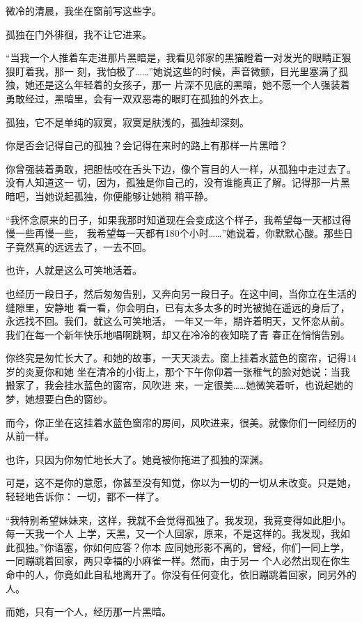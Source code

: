 		微冷的清晨，我坐在窗前写这些字。

		孤独在门外徘徊，我不让它进来。

		“当我一个人推着车走进那片黑暗是，我看见邻家的黑猫瞪着一对发光的眼睛正狠狠盯着我，那一
	刻，我怕极了……”她说这些的时候，声音微颤，目光里塞满了孤独，她还是这么年轻着的女孩子，那一
	片深不见底的黑暗，她不愿一个人强装着勇敢经过，黑暗里，会有一双双恶毒的眼盯在孤独的外衣上。

		孤独，它不是单纯的寂寞，寂寞是肤浅的，孤独却深刻。

		你是否会记得自己的孤独？会记得在来时的路上有那样一片黑暗？

		你曾强装着勇敢，把胆怯咬在舌头下边，像个盲目的人一样，从孤独中走过去了。没有人知道这一
	切，因为，孤独是你自己的，没有谁能真正了解。记得那一片黑暗吧，当她说起孤独，你便能够让她稍
	稍平静。

		“我怀念原来的日子，如果我那时知道现在会变成这个样子，我希望每一天都过得慢一些再慢一些，
	我希望每一天都有180个小时……”她说着，你默默心酸。那些日子竟然真的远远去了，一去不回。

		也许，人就是这么可笑地活着。

		也经历一段日子，然后匆匆告别，又奔向另一段日子。在这中间，当你立在生活的缝隙里，安静地
	看一看，你会明白，已有太多太多的时光被抛在遥远的身后了，永远找不回。我们，就这么可笑地活，
	一年又一年，期许着明天，又怀恋从前。我们在每一个新年快乐地唱啊跳啊，却又在冷冷的夜知晓了青
	春正在悄悄告别。

		你终究是匆忙长大了。和她的故事，一天天淡去。窗上挂着水蓝色的窗帘，记得14岁的炎夏你和她
	坐在清冷的小街上，那个下午你仰着一张稚气的脸对她说：当我搬家了，我会挂水蓝色的窗帘，风吹进
	来，一定很美……她微笑着听，也说起她的梦，她想要白色的窗纱。

		而今，你正坐在这挂着水蓝色窗帘的房间，风吹进来，很美。就像你们一同经历的从前一样。

		也许，只因为你匆忙地长大了。她竟被你拖进了孤独的深渊。

		可是，这不是你的意愿，你甚至没有知觉，你以为一切的一切从未改变。只是她，轻轻地告诉你：
	一切，都不一样了。

		“我特别希望妹妹来，这样，我就不会觉得孤独了。我发现，我竟变得如此胆小。每一天我一个人
	上学，天黑，又一个人回家，原来，不是这样的。我发现，我如此孤独。”你语塞，你如何应答？你本
	应同她形影不离的，曾经，你们一同上学，一同蹦跳着回家，两只幸福的小麻雀一样。然而，由于另一
	个人必然出现在你生命中的人，你竟如此自私地离开了。你没有任何变化，依旧蹦跳着回家，同另外的
	人。

		而她，只有一个人，经历那一片黑暗。


